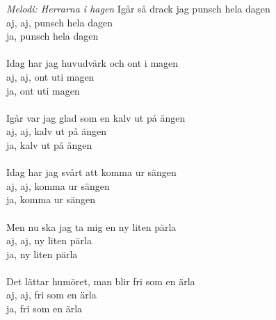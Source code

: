 {\footnotesize\textit{Melodi: Herrarna i hagen}}
\vspace{10pt}
Igår så drack jag punsch hela dagen\\
aj, aj, punsch hela dagen\\
ja, punsch hela dagen\\
\\
Idag har jag huvudvärk och ont i magen\\
aj, aj, ont uti magen\\
ja, ont uti magen\\
\\
Igår var jag glad som en kalv ut på ängen\\
aj, aj, kalv ut på ängen\\
ja, kalv ut på ängen\\
\\
Idag har jag svårt att komma ur sängen\\
aj, aj, komma ur sängen\\
ja, komma ur sängen\\
\\
Men nu ska jag ta mig en ny liten pärla\\
aj, aj, ny liten pärla\\
ja, ny liten pärla\\
\\
Det lättar humöret, man blir fri som en ärla\\
aj, aj, fri som en ärla\\
ja, fri som en ärla
